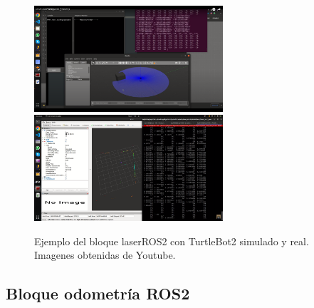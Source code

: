 \begin{figure} [H]
    \begin{center}
      \includegraphics[width=7cm]{figs/c4/laserS.png}
      \includegraphics[width=7cm]{figs/c4/laserR.png}
    \end{center}
    \caption[Ejemplo bloque láser ROS2]{Ejemplo del bloque laserROS2 con TurtleBot2 simulado y real. Imagenes obtenidas de Youtube\footnotemark.}
    \label{fig:vid_laserR}
\end{figure}

\subsection{Bloque odometría ROS2}
\label{subsec:odomROS2}

